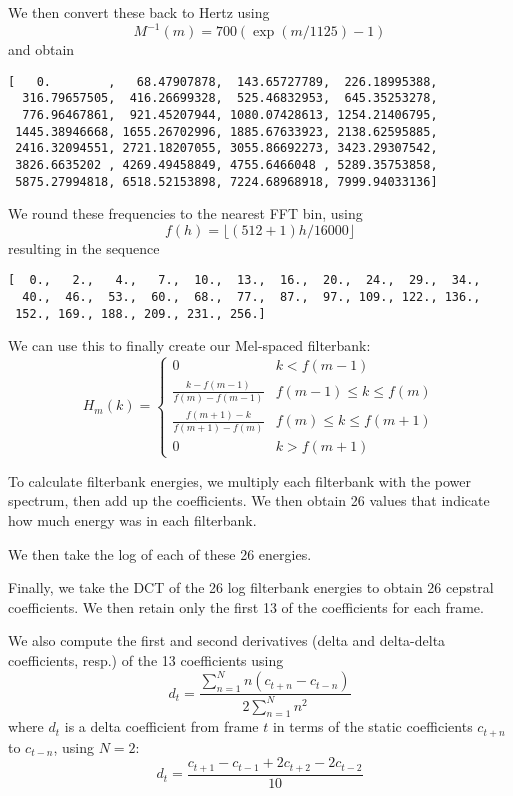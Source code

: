 \documentclass{article}
\begin{document}
We then convert these back to Hertz using
\begin{equation}
M^{-1}(m) = 700\left(\exp\left(m/1125\right)-1\right)
\end{equation}
and obtain
\begin{verbatim}
[   0.        ,   68.47907878,  143.65727789,  226.18995388,
  316.79657505,  416.26699328,  525.46832953,  645.35253278,
  776.96467861,  921.45207944, 1080.07428613, 1254.21406795,
 1445.38946668, 1655.26702996, 1885.67633923, 2138.62595885,
 2416.32094551, 2721.18207055, 3055.86692273, 3423.29307542,
 3826.6635202 , 4269.49458849, 4755.6466048 , 5289.35753858,
 5875.27994818, 6518.52153898, 7224.68968918, 7999.94033136]
\end{verbatim}

We round these frequencies to the nearest FFT bin, using
\begin{equation}
f(h) = \lfloor(512+1)h/16000\rfloor
\end{equation}
resulting in the sequence
\begin{verbatim}
[  0.,   2.,   4.,   7.,  10.,  13.,  16.,  20.,  24.,  29.,  34.,
  40.,  46.,  53.,  60.,  68.,  77.,  87.,  97., 109., 122., 136.,
 152., 169., 188., 209., 231., 256.]
\end{verbatim}

We can use this to finally create our Mel-spaced filterbank:
\begin{equation}
H_m(k) = \begin{cases}
0 & k<f(m-1)\\
\frac{k-f(m-1)}{f(m)-f(m-1)} & f(m-1)\leq k \leq f(m) \\
\frac{f(m+1) - k}{f(m+1)-f(m)} & f(m) \leq k \leq f(m+1)\\
0 & k > f(m+1)
\end{cases}
\end{equation}


To calculate filterbank energies, we multiply each filterbank with the power spectrum, then add up the coefficients. We then obtain 26 values that indicate how much energy was in each filterbank.

We then take the log of each of these 26 energies.

Finally, we take the DCT of the 26 log filterbank energies to obtain 26 cepstral coefficients. We then retain only the first 13 of the coefficients for each frame.

We also compute the first and second derivatives (delta and delta-delta coefficients, resp.) of the 13 coefficients using
\begin{equation}
d_t = \frac{\sum^N_{n=1}n\left(c_{t+n}-c_{t-n}\right)}{2\sum_{n=1}^Nn^2}
\end{equation}
where $d_t$ is a delta coefficient from frame $t$ in terms of the static coefficients $c_{t+n}$ to $c_{t-n}$, using $N=2$:
\begin{equation}
d_t = \frac{c_{t+1}-c_{t-1}+2c_{t+2}-2c_{t-2}}{10}
\end{equation}
\end{document}
